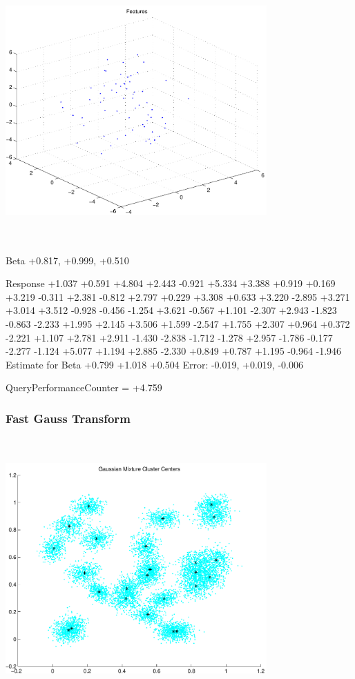 \documentclass[9pt]{article}
\theoremstyle{plain}
\theoremstyle{definition}
\theoremstyle{remark}
\numberwithin{equation}{section}
\begin{document}
\includegraphics[width=10.0cm,height=10.0cm]{regression_features.pdf}

Beta
+0.817, +0.999, +0.510

Response
+1.037
+0.591
+4.804
+2.443
-0.921
+5.334
+3.388
+0.919
+0.169
+3.219
-0.311
+2.381
-0.812
+2.797
+0.229
+3.308
+0.633
+3.220
-2.895
+3.271
+3.014
+3.512
-0.928
-0.456
-1.254
+3.621
-0.567
+1.101
-2.307
+2.943
-1.823
-0.863
-2.233
+1.995
+2.145
+3.506
+1.599
-2.547
+1.755
+2.307
+0.964
+0.372
-2.221
+1.107
+2.781
+2.911
-1.430
-2.838
-1.712
-1.278
+2.957
-1.786
-0.177
-2.277
-1.124
+5.077
+1.194
+2.885
-2.330
+0.849
+0.787
+1.195
-0.964
-1.946
Estimate for Beta
+0.799
+1.018
+0.504
Error:
-0.019, +0.019, -0.006


QueryPerformanceCounter  =  +4.759
\subsubsection{Fast Gauss Transform}
\includegraphics[width=10.0cm,height=10.0cm]{GaussianMixture_ClusterCenters25_Centers.pdf}
\end{document}
